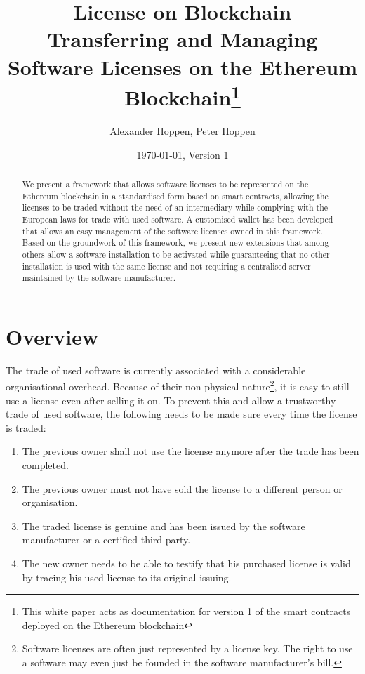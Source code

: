 \documentclass[a4paper]{article}
\title{License on Blockchain \\[5mm] \large Transferring and Managing Software Licenses on the Ethereum Blockchain\footnote{This white paper acts as documentation for version 1 of the smart contracts deployed on the Ethereum blockchain}}
\author{Alexander Hoppen, Peter Hoppen}
\date{\today, Version 1}
\begin{document}
\maketitle



\begin{abstract}
  We present a framework that allows software licenses to be represented on the Ethereum blockchain in a standardised form based on smart contracts, allowing the licenses to be traded without the need of an intermediary while complying with the European laws for trade with used software. A customised wallet has been developed that allows an easy management of the software licenses owned in this framework. Based on the groundwork of this framework, we present new extensions that among others allow a software installation to be activated while guaranteeing that no other installation is used with the same license and not requiring a centralised server maintained by the software manufacturer.
\end{abstract}

\section{Overview}

The trade of used software is currently associated with a considerable organisational overhead. Because of their non-physical nature\footnote{Software licenses are often just represented by a license key. The right to use a software may even just be founded in the software manufacturer's bill.}, it is easy to still use a license even after selling it on. To prevent this and allow a trustworthy trade of used software, the following needs to be made sure every time the license is traded:
\begin{enumerate}
  \item The previous owner shall not use the license anymore after the trade has been completed.
  \item The previous owner must not have sold the license to a different person or organisation.
  \item The traded license is genuine and has been issued by the software manufacturer or a certified third party.
  \item The new owner needs to be able to testify that his purchased license is valid by tracing his used license to its original issuing.
\end{enumerate}
\end{document}
